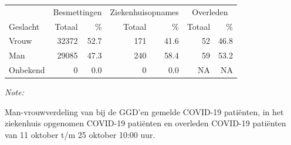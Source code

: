 \documentclass[
  english,
  man,floatsintext]{apa6}
\begin{document}
\begin{table}
\centering\begingroup\fontsize{11}{13}\selectfont

\begin{threeparttable}
\begin{tabular}{lrrrrrr}
\toprule
\multicolumn{1}{c}{ } & \multicolumn{2}{c}{Besmettingen} & \multicolumn{2}{c}{Ziekenhuisopnames} & \multicolumn{2}{c}{Overleden} \\
\cmidrule(l{3pt}r{3pt}){2-3} \cmidrule(l{3pt}r{3pt}){4-5} \cmidrule(l{3pt}r{3pt}){6-7}
Geslacht & Totaal & \% & Totaal & \% & Totaal & \%\\
\midrule
Vrouw & 32372 & 52.7 & 171 & 41.6 & 52 & 46.8\\
Man & 29085 & 47.3 & 240 & 58.4 & 59 & 53.2\\
Onbekend & 0 & 0.0 & 0 & 0.0 & NA & NA\\
\bottomrule
\end{tabular}
\begin{tablenotes}
\item \textit{Note: } 
\item Man-vrouwverdeling van bij de GGD’en gemelde COVID-19 patiënten, in het ziekenhuis opgenomen COVID-19 patiënten en overleden COVID-19 patiënten van 11 oktober t/m 25 oktober 10:00 uur.
\end{tablenotes}
\end{threeparttable}
\endgroup{}
\end{table}
\newpage
\end{document}
